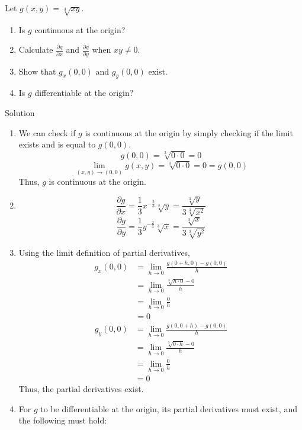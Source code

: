 \documentclass{article}
\begin{document}
\begin{problem}{}{}
    Let $g(x,y)=\sqrt[3]{xy}$.
    \begin{enumerate}[label=\textbf{\alph*}.]
        \item Is $g$ continuous at the origin?
        \item Calculate $\frac{\partial g}{\partial x}$ and $\frac{\partial g}{\partial y}$ when $xy\neq0$.
        \item Show that $g_x(0,0)$ and $g_y(0,0)$ exist.
        \item Is $g$ differentiable at the origin?
    \end{enumerate}
\end{problem}
\begin{solution}{}{}
    Solution
    \begin{enumerate}[label=\textbf{\alph*}.]
        \item We can check if $g$ is continuous at the origin by simply checking if the limit exists and is equal to $g(0,0)$.
        \[g(0,0)=\sqrt[3]{0\cdot0}=0\]
        \[\lim_{(x,y)\to(0,0)} g(x,y)=\sqrt[3]{0\cdot0}=0=g(0,0)\]
        Thus, $g$ is continuous at the origin.
        \item 
        \[\frac{\partial g}{\partial x}=\frac{1}{3}x^{-\frac{2}{3}}\sqrt[3]{y}=\frac{\sqrt[3]{y}}{3\sqrt[3]{x^2}}\]
        \[\frac{\partial g}{\partial y}=\frac{1}{3}y^{-\frac{2}{3}}\sqrt[3]{x}=\frac{\sqrt[3]{x}}{3\sqrt[3]{y^2}}\]
        \item Using the limit definition of partial derivatives,
        \begin{align*}
            g_x(0,0)&=\lim_{h\to0}\frac{g(0+h,0)-g(0,0)}{h}\\
            &=\lim_{h\to0}\frac{\sqrt[3]{h\cdot0}-0}{h}\\
            &=\lim_{h\to0}\frac{0}{h}\\
            &=0
        \end{align*}
        \begin{align*}
            g_y(0,0)&=\lim_{h\to0}\frac{g(0,0+h)-g(0,0)}{h}\\
            &=\lim_{h\to0}\frac{\sqrt[3]{0\cdot h}-0}{h}\\
            &=\lim_{h\to0}\frac{0}{h}\\
            &=0
        \end{align*}
        Thus, the partial derivatives exist.
        \item For $g$ to be differentiable at the origin, its partial derivatives must exist, and the following must hold:

\end{enumerate}
\end{solution}
\end{document}

